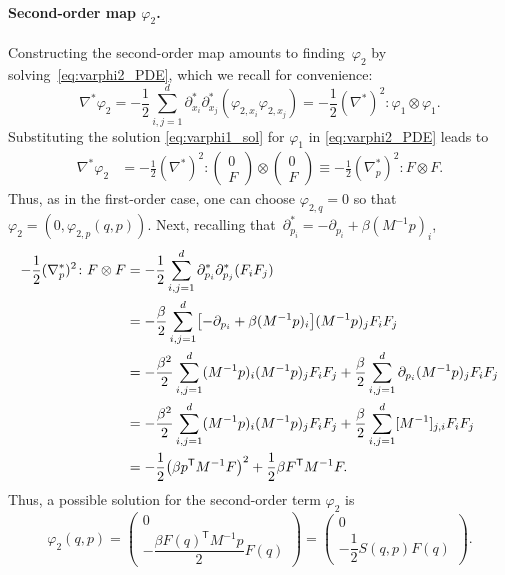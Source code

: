 \documentclass[11pt]{article}
\renewcommand{\t}{\mathsf T}
\DeclarePairedDelimiter\paren{\lparen}{\rparen}
\DeclarePairedDelimiter\bkt{\lbrack}{\rbrack}
\theoremstyle{definition}
\let\oldparagraph=\paragraph
\renewcommand\paragraph[1]{\oldparagraph{#1.}}
\begin{document}
\paragraph{Second-order map $\varphi_2$} Constructing the second-order map amounts to finding~$\varphi_2$ by solving~\eqref{eq:varphi2_PDE}, which we recall for convenience:
\begin{equation}
	\nabla^*\varphi_2 = -\frac{1}{2}\sum_{i,j=1}^d \partial_{x_i}^*\partial_{x_j}^* (\varphi_{2,x_i}\varphi_{2,x_j}) = -\frac{1}{2}(\nabla^*)^2 \colon \varphi_1\otimes \varphi_1.
\end{equation}
Substituting the solution \eqref{eq:varphi1_sol} for $\varphi_1$ in \eqref{eq:varphi2_PDE} leads to
\begin{align}
    \nabla^*\varphi_2 &= -\frac{1}{2}(\nabla^*)^2\colon 
    \begin{pmatrix}
        0 \\ F    
    \end{pmatrix} \otimes 
    \begin{pmatrix}
        0 \\ F    
    \end{pmatrix} \equiv -\frac{1}{2}(\nabla_p^*)^2 \colon F\otimes F.
\end{align}
Thus, as in the first-order case, one can choose $\varphi_{2,q} = 0$ so that $\varphi_2 = (0, \varphi_{2,p}(q,p))$. Next, recalling that~$\partial^*_{p_i} = -\partial_{p_i} + \beta (M^{-1}p)_i$,
\begin{align}
    -\frac{1}{2}(\nabla_p^*)^2 \colon F\otimes F &= -\frac{1}{2}\sum_{i,j=1}^d \partial_{p_i}^*\partial_{p_j}^* \paren*{F_i F_j} \\
    &= -\frac{\beta}{2}\sum_{i,j=1}^d \bkt*{-\partial_{p_i} + \beta (M^{-1}p)_i}(M^{-1}p)_j F_i F_j \\
    &= -\frac{\beta^2}{2}\sum_{i,j=1}^d (M^{-1}p)_i(M^{-1}p)_j F_i F_j + \frac{\beta}{2} \sum_{i,j=1}^d \partial_{p_i}(M^{-1}p)_j F_iF_j \\
    &= -\frac{\beta^2}{2}\sum_{i,j=1}^d (M^{-1}p)_i(M^{-1}p)_j F_i F_j +\frac{\beta}{2}\sum_{i,j=1}^d [M^{-1}]_{j,i} F_i F_j \\
    &= -\frac{1}{2}\paren*{\beta p^\t M^{-1}F}^2 + \frac{1}{2}\beta F^\t M^{-1}F.
\end{align}
Thus, a possible solution for the second-order term $\varphi_2$ is
\begin{equation}
    \varphi_2(q,p) = 
    \begin{pmatrix}
        0 \\ -\dfrac{\beta F(q)^\t M^{-1} p}{2}F(q)
    \end{pmatrix} = 
    \begin{pmatrix}
        0 \\ -\dfrac{1}{2}S(q,p)F(q)
    \end{pmatrix}.
\end{equation}
\end{document}
